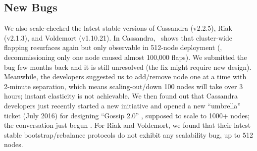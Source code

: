 


\subsection{New Bugs}
\label{eval-new}



We also scale-checked the latest stable versions of Cassandra (v2.2.5),
Riak (v2.1.3), and Voldemort (v1.10.21). 
%
In Cassandra, \sck\ shows that cluster-wide flapping resurfaces again but
only observable in 512-node deployment (\eg, decommissioning only one node
caused almost 100,000 flaps).  We submitted the bug few months back and it
is still unresolved (the fix might require new design).
%
Meanwhile, the developers suggested us to add/remove node one at a time
with 2-minute separation, which means scaling-out/down 100 nodes will take
over 3 hours; instant elasticity is not achievable.
%
We then found out that Cassandra developers just recently started a new
initiative and opened a new ``umbrella'' ticket (July 2016) for designing
``Gossip 2.0'' \cite{Gossip20}, supposed to scale to
1000+ nodes; the conversation just begun \cite{Gossip20Mail}.
%
%
For Riak and Voldemort, we found that their latest-stable
bootstrap/rebalance protocols do not exhibit any scalability bug, up to
512 nodes.




\fi

